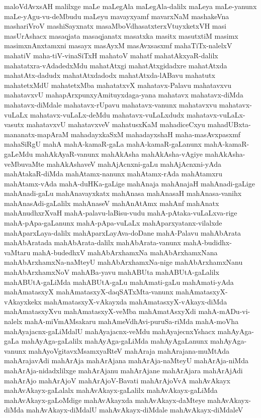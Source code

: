 {maloVdAvxsAH
malilxge
maLe
maLegAla
maLegAla-dalilx
maLeya
maLe-yanunx
maLe-yAgu-vu-deMbudu
maLeyu
mavayxyamf
mavarxNaM
mashakeVna
mashariVroV
mashiSayxnatx
masaMboVdhasatxterxVtuyxketxVH
masi
masUrAshacx
masaqjata
masaqjanatx
masatxka
masitx
masutxtiM
masimx
masimxnAnxtamxni
masayx
masAyxM
masAvxsasxmf
mahaTiTx-nalelxV
mahatiV
maha-tiV-vinaSiTxH
mahatoV
mahatf
mahatAkxyaR-dalilx
mahatatxra-vAdadedxMdu
mahatAtxgi
mahatAtxgidadxre
mahatAtxda
mahatAtx-dadudx
mahatAtxdadodx
mahatAtxda-lABavu
mahatutx
mahatetxMdU
mahatetxMba
mahatatxvX
mahatavx-Palavu
mahatavxvu
mahatavxvU
mahapArxpunxyAmituyxdaga-yana
mahatavx
mahatavx-diMda
mahatavx-diMdale
mahatavx-rUpavu
mahatavx-vanunx
mahatavxvu
mahatavx-vuLaLx
mahatavx-vuLaLx-deMdu
mahatavx-vuLaLxdudx
mahatavx-vuLaLx-vasutx
mahatavxvU
mahatavxveV
mahatusxKaM
mahadiceCxyu
mahadUBxta-mananatx-mapAraM
mahadayxkaSxM
mahadayxshaH
maha-masAvxpasxmf
mahaSiRgU
mahA
mahA-kamaR-gaLa
mahA-kamaR-gaLanunx
mahA-kamaR-gaLeMdu
mahAkAyaR-vanunx
mahAkAsha
mahAkAsha-vAgiye
mahAkAsha-veMbuvaMte
mahAkAshaveV
mahAjAcnxni-gaLu
mahAjAcnxni-yAda
mahAtakaR-diMda
mahAtamx-nanunx
mahAtamx-rAda
mahAtamxru
mahAtamx-vAda
mahA-duHKa-gaLige
mahAnaja
mahAnajaH
mahAnadi-gaLige
mahAnadi-gaLu
mahAnavayxkatx
mahAnasa
mahAnasaH
mahAnasa-vanihx
mahAnasAdi-gaLalilx
mahAnaseV
mahAnAtAmx
mahAnf
mahAnatx
mahAnudhxrXvaH
mahA-palavu-laBisu-vudu
mahA-pAtaka-vuLaLxva-rige
mahA-pApa-gaLanunx
mahA-pApa-vuLaLx
mahAparxyatanx-vilalxde
mahAparxLaya-dalilx
mahAparxLayAva-doDane
mahA-Palavu
mahAbArata
mahAbAratada
mahAbArata-dalilx
mahAbArata-vanunx
mahA-budidhx-vaMtaru
mahA-budedhxV
mahAbArxhamxNa
mahAbArxhamxNana
mahAbArxhamxNa-naMteyU
mahAbArxhamxNa-nige
mahAbArxhamxNanu
mahAbArxhamxNoV
mahABa-yavu
mahABUta
mahABUtA-gaLalilx
mahABUtA-gaLiMda
mahABUtA-gaLu
mahAmati-gaLu
mahAmati-yAda
mahAmatasxyX
mahAmatasxyX-daqSATxMta-vanunx
mahAmatasxyX-vAkayxkekx
mahAmatasxyX-vAkayxda
mahAmatasxyX-vAkayx-diMda
mahAmatasxyXvu
mahAmatasxyX-veMba
mahAmatAsxyXdi
mahA-mADu-vi-nalelx
mahA-miVmAMsakaru
mahAmeVdhAvi-puruSa-riMda
mahA-moVha
mahAyajacnx-gaLiMdalU
mahAyajacnx-veMdu
mahAyajecnxYshacx
mahAyAga-gaLa
mahAyAga-gaLalilx
mahAyAga-gaLiMda
mahAyAgaLanunx
mahAyAga-vanunx
mahAyoVgitavxMsamxyaRteV
mahAraja
mahArajana-muMtAda
mahArajavAdi
mahArAja
mahArAjana
mahArAja-naMteyU
mahArAja-niMda
mahArAja-nidadxlilxge
mahArAjanu
mahArAjane
mahArAjara
mahArAjAdi
mahArAjo
mahArAjoV
mahArAjoV-Bavati
mahArAjoVvA
mahAvAkayx
mahAvAkayx-gaLalalx
mahAvAkayx-gaLalilx
mahAvAkayx-gaLiMda
mahAvAkayx-gaLoMdige
mahAvAkayxda
mahAvAkayx-daMteye
mahAvAkayx-diMda
mahAvAkayx-diMdalU
mahAvAkayx-diMdale
mahAvAkayx-diMdaleV
}
